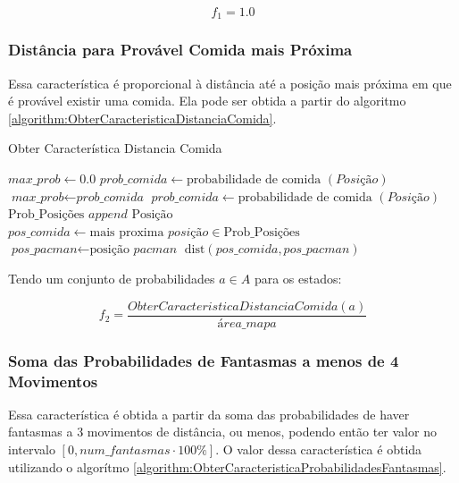 $$ f_1 = 1.0 $$

\subsubsection*{Distância para Provável Comida mais Próxima} \label{subsubsection:DistProvavelComida}

Essa característica é proporcional à distância até a posição mais próxima em que é provável existir uma comida. Ela pode ser obtida a partir do algoritmo \ref{algorithm:ObterCaracteristicaDistanciaComida}.

\begin{algorithm}[H]
	\caption{Obter Característica Distancia Comida} \label{algorithm:ObterCaracteristicaDistanciaComida}
	\begin{algorithmic}[1]
			\State $\textit{max\_prob} \gets 0.0 $
				\State $\textit{prob\_comida} \gets \text{probabilidade de comida } \left( \textit{Posição} \right) $
					\State $\textit{max\_prob} \gets \textit{prob\_comida} $
				\EndIf 
			\EndFor
				\State $\textit{prob\_comida} \gets \text{probabilidade de comida } \left( \textit{Posição} \right) $
					\State $ \text{Prob\_Posições } append \text{ Posição} $
				\EndIf 
			\EndFor
			\State $\textit{pos\_comida} \gets \text{mais proxima }\textit{posição} \in \text{Prob\_Posições} $
			\State $\textit{pos\_pacman} \gets \text{posição }\textit{pacman} $
			\State \Return $ \text{dist} \left( \textit{pos\_comida}, \textit{pos\_pacman} \right)  $
		\EndProcedure
	\end{algorithmic}
\end{algorithm}

Tendo um conjunto de probabilidades $ a \in A $ para os estados:

$$ f_2 = \frac{ObterCaracteristicaDistanciaComida \left( a \right)}{\textit{área\_mapa}} $$

\subsubsection*{Soma das Probabilidades de Fantasmas a menos de 4 Movimentos}

Essa característica é obtida a partir da soma das probabilidades de haver fantasmas a 3 movimentos de distância, ou menos, podendo então ter valor no intervalo $ \left[ 0, num\_fantasmas \cdot 100\% \right] $. O valor dessa característica é obtida utilizando o algorítmo \ref{algorithm:ObterCaracteristicaProbabilidadesFantasmas}.


